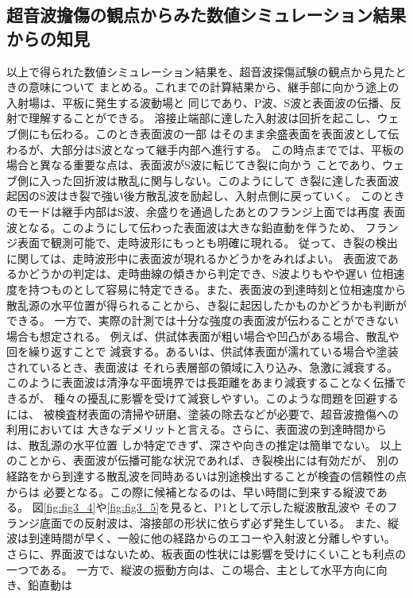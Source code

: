 \subsection{超音波擔傷の観点からみた数値シミュレーション結果からの知見}
以上で得られた数値シミュレーション結果を、超音波探傷試験の観点から見たときの意味について
まとめる。これまでの計算結果から、継手部に向かう途上の入射場は、平板に発生する波動場と
同じであり、P波、S波と表面波の伝播、反射で理解することができる。
溶接止端部に達した入射波は回折を起こし、ウェブ側にも伝わる。このとき表面波の一部
はそのまま余盛表面を表面波として伝わるが、大部分はS波となって継手内部へ進行する。
この時点まででは、平板の場合と異なる重要な点は、表面波がS波に転じてき裂に向かう
ことであり、ウェブ側に入った回折波は散乱に関与しない。このようにして
き裂に達した表面波起因のS波はき裂で強い後方散乱波を励起し、入射点側に戻っていく。
このときのモードは継手内部はS波、余盛りを通過したあとのフランジ上面では再度
表面波となる。このようにして伝わった表面波は大きな鉛直動を伴うため、
フランジ表面で観測可能で、走時波形にもっとも明確に現れる。
従って、き裂の検出に関しては、走時波形中に表面波が現れるかどうかをみればよい。
表面波であるかどうかの判定は、走時曲線の傾きから判定でき、S波よりもやや遅い
位相速度を持つものとして容易に特定できる。また、表面波の到達時刻と位相速度から
散乱源の水平位置が得られることから、き裂に起因したかものかどうかも判断ができる。
一方で、実際の計測では十分な強度の表面波が伝わることができない場合も想定される。
例えば、供試体表面が粗い場合や凹凸がある場合、散乱や回を繰り返すことで
減衰する。あるいは、供試体表面が濡れている場合や塗装されているとき、表面波は
それら表層部の領域に入り込み、急激に減衰する。
このように表面波は清浄な平面境界では長距離をあまり減衰することなく伝播できるが、
種々の擾乱に影響を受けて減衰しやすい。このような問題を回避するには、
被検査材表面の清掃や研磨、塗装の除去などが必要で、超音波擔傷への利用においては
大きなデメリットと言える。さらに、表面波の到達時間からは、散乱源の水平位置
しか特定できず、深さや向きの推定は簡単でない。
以上のことから、表面波が伝播可能な状況であれば、き裂検出には有効だが、
別の経路をから到達する散乱波を同時あるいは別途検出することが検査の信頼性の点からは
必要となる。この際に候補となるのは、早い時間に到来する縦波である。
図\ref{fig:fig3_4}や\ref{fig:fig3_5}を見ると、P1として示した縦波散乱波や
そのフランジ底面での反射波は、溶接部の形状に依らず必ず発生している。
また、縦波は到達時間が早く、一般に他の経路からのエコーや入射波と分離しやすい。
さらに、界面波ではないため、板表面の性状には影響を受けにくいことも利点の一つである。
一方で、縦波の振動方向は、この場合、主として水平方向に向き、鉛直動は

